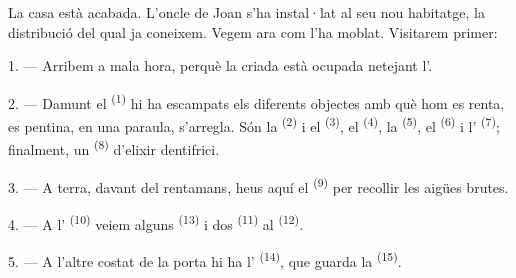 %
%

\VUsaut{6.0mm}
\VUsaut{1.4mm}
\VUsaut{0.4mm}
\VUsaut{2.2mm}

La casa està acabada. L'oncle de Joan s'ha instal·lat al seu nou habitatge, la
distribució del qual ja coneixem. Vegem ara com l'ha moblat. Visitarem primer:

\VUsaut{3.0mm}

1. --- Arribem a mala hora, perquè la criada està ocupada netejant
l'.

2. --- Damunt el  \textsuperscript{(1)} hi ha escampats els
diferents objectes amb què hom es renta, es pentina, en una paraula, s'arregla.
Són la  \textsuperscript{(2)} i el 
\textsuperscript{(3)}, el  \textsuperscript{(4)}, la
 \textsuperscript{(5)}, el  \textsuperscript{(6)} i
l' \textsuperscript{(7)}; finalment, un 
\textsuperscript{(8)} d'elixir dentifrici.

3. --- A terra, davant del rentamans, heus aquí el 
\textsuperscript{(9)} per recollir les aigües brutes.

4. --- A l' \textsuperscript{(10)} veiem alguns
 \textsuperscript{(13)} i dos 
\textsuperscript{(11)} al  \textsuperscript{(12)}.

5. --- A l'altre costat de la porta hi ha l'
\textsuperscript{(14)}, que guarda la 
\textsuperscript{(15)}.

